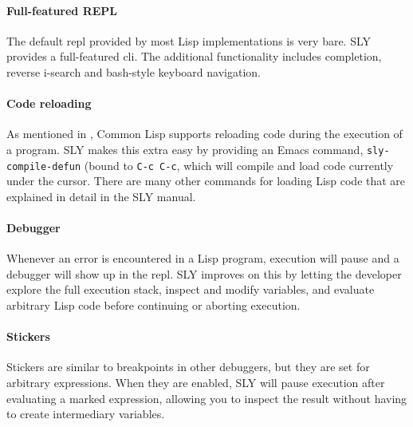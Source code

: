 \paragraph{Full-featured REPL}

The default \ac{repl} provided by most Lisp implementations is very bare.
SLY provides a full-featured \ac{cli}.
The additional functionality includes completion,
reverse i-search and bash-style keyboard navigation.

\paragraph{Code reloading}

As mentioned in ,
Common Lisp supports reloading code during the execution of a program.
SLY makes this extra easy by providing an Emacs command,
\texttt{sly-compile-defun} (bound to \texttt{C-c C-c},
which will compile and load code currently under the cursor.
There are many other commands for loading Lisp code that are explained in detail in the SLY manual\cite{sly_manual}.

\paragraph{Debugger}

Whenever an error is encountered in a Lisp program,
execution will pause and a debugger will show up in the \ac{repl}.
SLY improves on this by letting the developer explore the full execution stack,
inspect and modify variables,
and evaluate arbitrary Lisp code before continuing or aborting execution.

\paragraph{Stickers}

Stickers are similar to breakpoints in other debuggers,
but they are set for arbitrary expressions.
When they are enabled,
SLY will pause execution after evaluating a marked expression,
allowing you to inspect the result without having to create intermediary variables.
